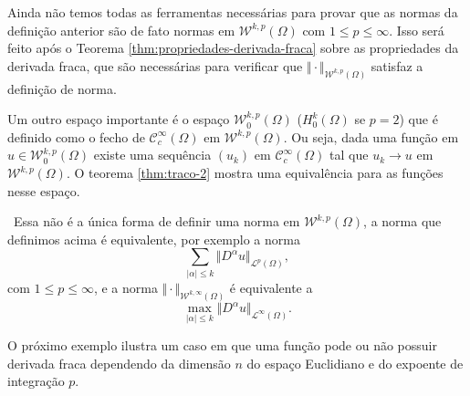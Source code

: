 \documentclass[a4paper, 11pt]{book}
\theoremstyle{definition}
\newcommand{\obs}{\noindent{\textbf{\textcolor{black}{\sffamily Observação:}}}~}
\newcommand{\cC}{\mathcal{C}}
\newcommand{\cL}{\mathcal{L}}
\newcommand{\cW}{\mathcal{W}}
\begin{document}
Ainda não temos todas as ferramentas necessárias para provar que as normas da definição anterior são de fato normas em $\cW^{k,p}(\Omega)$ com $1 \leqslant p \leqslant \infty$. Isso será feito após o Teorema \ref{thm:propriedades-derivada-fraca} sobre as propriedades da derivada fraca, que são necessárias para verificar que $\Vert \cdot \Vert_{\cW^{k,p}(\Omega)}$ satisfaz a definição de norma.

Um outro espaço importante é o espaço $\cW^{k,p}_0(\Omega)$ ($H^k_0(\Omega)$ se $p = 2$) que é definido como o fecho de $\cC^{\infty}_c(\Omega)$ em $\cW^{k,p}(\Omega)$. Ou seja, dada uma função em $u \in \cW^{k,p}_0(\Omega)$ existe uma sequência $(u_k)$ em $\cC^{\infty}_c(\Omega)$ tal que $u_k \to u$ em $\cW^{k,p}(\Omega)$.
O teorema \ref{thm:traco-2} mostra uma equivalência para as funções nesse espaço.

\obs Essa não é a única forma de definir uma norma em $\cW^{k,p}(\Omega)$, a norma que definimos acima é equivalente, por exemplo a norma
\[
    \sum_{|\alpha| \leqslant k} \Vert D^\alpha u \Vert_{\cL^p(\Omega)},
\]
com $1 \leqslant p \leqslant \infty$, e a norma $\Vert \cdot \Vert_{\cW^{k,\infty}(\Omega)}$ é equivalente a
\[
    \max_{|\alpha|\leqslant k} \Vert D^\alpha u \Vert_{\cL^\infty(\Omega)}.
\]

O próximo exemplo ilustra um caso em que uma função pode ou não possuir derivada fraca dependendo da dimensão $n$ do espaço Euclidiano e do expoente de integração $p$.
\end{document}
